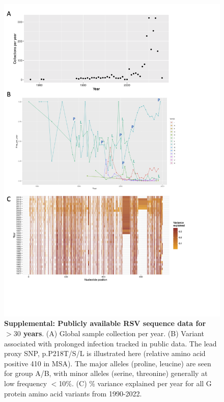 \documentclass{article} %
\begin{document}
\begin{figure}[ht] \hspace{-0.5cm} \begin{center}
    \includegraphics[scale=0.15]{S2}
	\caption{\textbf{Supplemental: Publicly available RSV sequence data for $>30$ years}. (A) Global sample collection per year. (B) Variant associated with prolonged infection tracked in public data. The lead proxy SNP, p.P218T/S/L is illustrated here (relative amino acid positive 410 in MSA). The major alleles (proline, leucine) are seen for group A/B, with minor alleles (serine, threonine) generally at low frequency $<$10\%.
	(C) \% variance explained per year for all G protein amino acid variants from 1990-2022. %
	}
	\label{fig:S2} \end{center}
\end{figure}
\end{document}
